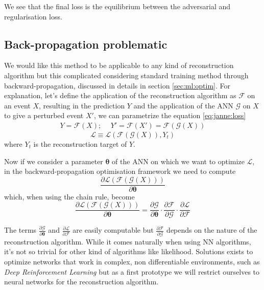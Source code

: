 \documentclass[../main.tex]{subfiles}
\begin{document}
We see that the final loss is the equilibrium between the adversarial and regularisation loss.

\subsection{Back-propagation problematic}

We would like this method to be applicable to any kind of reconstruction algorithm but this complicated considering standard training method through backward-propagation, discussed in details in section \ref{sec:ml:optim}. For explanation, let's define the application of the reconstruction algorithm as $\mathcal{F}$ on an event $X$, resulting in the prediction $Y$ and the application of the ANN $\mathcal{G}$ on $X$ to give a perturbed event $X'$, we can parametrize the equation \ref{eq:janne:loss}
\begin{align}
  Y = \mathcal{F}(X); ~~& Y' = \mathcal{F}(X') = \mathcal{F}(\mathcal{G}(X))
\end{align}
\begin{equation}
  \mathcal{L} \equiv \mathcal{L}(\mathcal{F}(\mathcal{G}(X)), Y_t)
\end{equation}
where $Y_t$ is the reconstruction target of $Y$.

Now if we consider a parameter $\bm{\theta}$ of the ANN on which we want to optimize $\mathcal{L}$, in the backward-propagation optimisation framework we need to compute
\begin{equation}
  \frac{\partial \mathcal{L}(\mathcal{F}(\mathcal{G}(X)))}{\partial \bm{\theta}}
\end{equation}
which, when using the chain rule, become
\begin{equation}
  \frac{\partial \mathcal{L}(\mathcal{F}(\mathcal{G}(X)))}{\partial \bm{\theta}} = \frac{\partial \mathcal{G}}{\partial \bm{\theta}} \cdot \frac{\partial \mathcal{F}}{\partial \mathcal{G}} \cdot \frac{\partial \mathcal{L}}{\partial \mathcal{F}}
\end{equation}

The terms $\frac{\partial \mathcal{G}}{\partial \bm{\theta}}$ and $\frac{\partial \mathcal{L}}{\partial \mathcal{F}}$ are easily computable but $\frac{\partial \mathcal{F}}{\partial \mathcal{G}}$ depends on the nature of the reconstruction algorithm. While it comes naturally when using NN algorithms, it's not so trivial for other kind of algorithms like likelihood. Solutions exists to optimize networks that work in complex, non differentiable environments, such as \textit{Deep Reinforcement Learning} \cite{kiran_deep_2021, vinyals_grandmaster_2019} but as a first prototype we will restrict ourselves to neural networks for the reconstruction algorithm.
\end{document}
